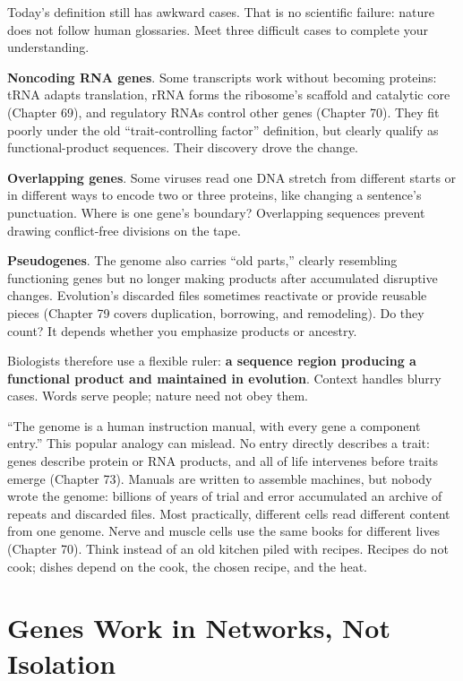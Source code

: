 Today's definition still has awkward cases. That is no scientific failure: nature does not follow human glossaries. Meet three difficult cases to complete your understanding.

\textbf{Noncoding RNA genes}. Some transcripts work without becoming proteins: tRNA adapts translation, rRNA forms the ribosome's scaffold and catalytic core (Chapter 69), and regulatory RNAs control other genes (Chapter 70). They fit poorly under the old ``trait-controlling factor'' definition, but clearly qualify as functional-product sequences. Their discovery drove the change.

\textbf{Overlapping genes}. Some viruses read one DNA stretch from different starts or in different ways to encode two or three proteins, like changing a sentence's punctuation. Where is one gene's boundary? Overlapping sequences prevent drawing conflict-free divisions on the tape.

\textbf{Pseudogenes}. The genome also carries ``old parts,'' clearly resembling functioning genes but no longer making products after accumulated disruptive changes. Evolution's discarded files sometimes reactivate or provide reusable pieces (Chapter 79 covers duplication, borrowing, and remodeling). Do they count? It depends whether you emphasize products or ancestry.

Biologists therefore use a flexible ruler: \textbf{a sequence region producing a functional product and maintained in evolution}. Context handles blurry cases. Words serve people; nature need not obey them.

\begin{wuqu}
``The genome is a human instruction manual, with every gene a component entry.'' This popular analogy can mislead. No entry directly describes a trait: genes describe protein or RNA products, and all of life intervenes before traits emerge (Chapter 73). Manuals are written to assemble machines, but nobody wrote the genome: billions of years of trial and error accumulated an archive of repeats and discarded files. Most practically, different cells read different content from one genome. Nerve and muscle cells use the same books for different lives (Chapter 70). Think instead of an old kitchen piled with recipes. Recipes do not cook; dishes depend on the cook, the chosen recipe, and the heat.
\end{wuqu}

\section{Genes Work in Networks, Not Isolation}

